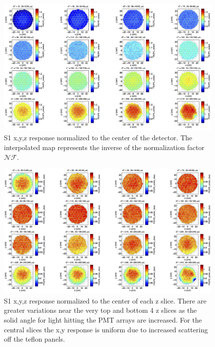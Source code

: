 \renewcommand{\baselinestretch}{1}
\small\normalsize
\begin{figure}\centering
\includegraphics[width=230mm]{Chapter_XYZ_Corr/Thesis_Corr_Plots/S1_XYZ_Kr_norm_center_crop_80.png}
\caption{S1 x,y,z response normalized to the center of the detector. The interpolated map represents the inverse of the normalization factor $\mathcal{NF}$. }
\label{fig:S1_XYZ_norm_center}
\end{figure}
\renewcommand{\baselinestretch}{2}
\small\normalsize

\begin{figure}[h!]\centering
\includegraphics[width=150mm]{Chapter_XYZ_Corr/Thesis_Corr_Plots/S1_XYZ_Kr_norm_center_slice_crop.png}
\caption{S1 x,y,z response normalized to the center of each z slice. There are greater variations near the very top and bottom 4 z slices as the solid angle for light hitting the PMT arrays are increased. For the central slices the x,y response is uniform due to increased scattering off the teflon panels. }
\label{fig:S1_XYZ_norm_center_slice}
\end{figure}

